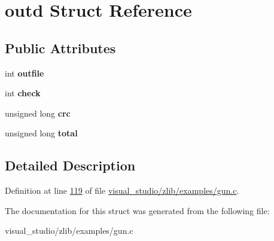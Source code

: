 \hypertarget{structoutd}{}\section{outd Struct Reference}
\label{structoutd}
\subsection*{Public Attributes}
\begin{DoxyCompactItemize}
\item 
\mbox{\label{structoutd_a5082d9db14154a733403decdf852e9e8}} 
int {\bfseries outfile}
\item 
\mbox{\label{structoutd_a3e4575647d91f09865b59b4097f16583}} 
int {\bfseries check}
\item 
\mbox{\label{structoutd_a5408635b43ee66015daca92aa117aa51}} 
unsigned long {\bfseries crc}
\item 
\mbox{\label{structoutd_a14d1b98be9ddb6c511a029815f96874a}} 
unsigned long {\bfseries total}
\end{DoxyCompactItemize}


\subsection{Detailed Description}


Definition at line \hyperlink{visual__studio_2zlib_2examples_2gun_8c_source_l00119}{119} of file \hyperlink{visual__studio_2zlib_2examples_2gun_8c_source}{visual\+\_\+studio/zlib/examples/gun.\+c}.



The documentation for this struct was generated from the following file\+:\begin{DoxyCompactItemize}
\item 
visual\+\_\+studio/zlib/examples/gun.\+c\end{DoxyCompactItemize}
